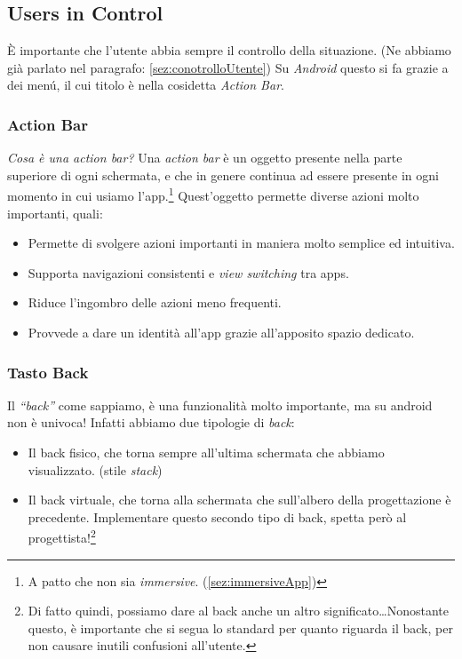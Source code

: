 \documentclass[oneside]{book}
\begin{document}
		\subsection{Users in Control} \label{ControlloUtente}
			È importante che l'utente abbia sempre il controllo della situazione. (Ne abbiamo già parlato nel paragrafo: \ref{sez:conotrolloUtente}) Su \emph{Android} questo si fa grazie a dei menú, il cui titolo è nella cosidetta \emph{Action Bar}.\\

			\subsubsection{Action Bar} \label{sez:actionBar}
				\emph{Cosa è una action bar?} Una \emph{action bar} è un oggetto presente nella parte superiore di ogni schermata, e che in genere continua ad essere presente in ogni momento in cui usiamo l'app.\footnote{A patto che non sia \emph{immersive}. (\ref{sez:immersiveApp})} Quest'oggetto permette diverse azioni molto importanti, quali:
				\begin{itemize}
				\item Permette di svolgere azioni importanti in maniera molto semplice ed intuitiva.
				\item Supporta navigazioni consistenti e \emph{view switching} tra apps.
				\item Riduce l'ingombro delle azioni meno frequenti.
				\item Provvede a dare un identità all'app grazie all'apposito spazio dedicato.
				\end{itemize}

			\subsubsection{Tasto Back} \label{TastoBackAndroid}
				Il \emph{``back''} come sappiamo, è una funzionalità molto importante, ma su android non è univoca! Infatti abbiamo due tipologie di \emph{back}:
				\begin{itemize}
				\item Il back fisico, che torna sempre all'ultima schermata che abbiamo visualizzato. (stile \emph{stack})
				\item Il back virtuale, che torna alla schermata che sull'albero della progettazione è precedente. Implementare questo secondo tipo di back, spetta però al progettista!\footnote{Di fatto quindi, possiamo dare al back anche un altro significato\dots Nonostante questo, è importante che si segua lo standard per quanto riguarda il back, per non causare inutili confusioni all'utente.}
				\end{itemize}
				
\end{document}
